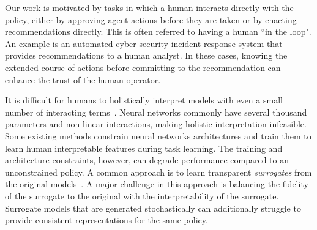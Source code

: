 \documentclass[letterpaper]{article} %
\begin{document}
Our work is motivated by tasks in which a human interacts directly with the policy, either by approving agent actions before they are taken or by enacting recommendations directly. 
This is often referred to having a human ``in the loop".
An example is an automated cyber security incident response system that provides recommendations to a human analyst.
In these cases, knowing the extended course of actions before committing to the recommendation can enhance the trust of the human operator.

It is difficult for humans to holistically interpret models with even a small number of interacting terms~\cite{lipton2018}. 
Neural networks commonly have several thousand parameters and non-linear interactions, making holistic interpretation infeasible.
Some existing methods constrain neural networks architectures and train them to learn human interpretable features during task learning. %
The training and architecture constraints, however, can degrade performance compared to an unconstrained policy. 
A common approach is to learn transparent \emph{surrogates} from the original models~\cite{adadi2018}.
A major challenge in this approach is balancing the fidelity of the surrogate to the original with the interpretability of the surrogate. 
Surrogate models that are generated stochastically can additionally struggle to provide consistent representations for the same policy. 
\end{document}
